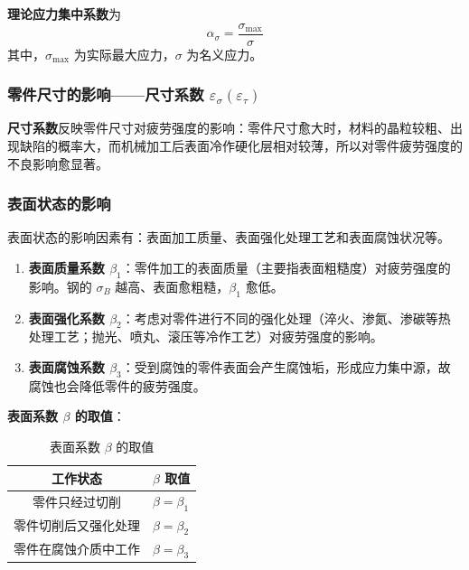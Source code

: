 \begin{definition}[理论应力集中系数]
\label{def:理论应力集中系数}
\textbf{理论应力集中系数}为
\begin{equation}
	\alpha_\sigma=\frac{\sigma_{\max}}{\sigma}
	\label{eq:强度:理论应力集中系数}
\end{equation}
其中，$\sigma_{\max}$ 为实际最大应力，$\sigma$ 为名义应力。
\end{definition}

\subsubsection{零件尺寸的影响——尺寸系数 $\varepsilon_\sigma(\varepsilon_\tau)$}

\begin{definition}
\label{def:尺寸系数}
\textbf{尺寸系数}反映零件尺寸对疲劳强度的影响：零件尺寸愈大时，材料的晶粒较粗、出现缺陷的概率大，而机械加工后表面冷作硬化层相对较薄，所以对零件疲劳强度的不良影响愈显著。
\end{definition}

\subsubsection{表面状态的影响}

\begin{definition}[表面状态的影响因素]
\label{def:表面状态}
表面状态的影响因素有：表面加工质量、表面强化处理工艺和表面腐蚀状况等。
\begin{enumerate}
	\item \textbf{表面质量系数 $\beta_1$}：零件加工的表面质量（主要指表面粗糙度）对疲劳强度的影响。钢的 $\sigma_B$ 越高、表面愈粗糙，$\beta_1$ 愈低。
	\item \textbf{表面强化系数 $\beta_2$}：考虑对零件进行不同的强化处理（淬火、渗氮、渗碳等热处理工艺；抛光、喷丸、滚压等冷作工艺）对疲劳强度的影响。
	\item \textbf{表面腐蚀系数 $\beta_3$}：受到腐蚀的零件表面会产生腐蚀垢，形成应力集中源，故腐蚀也会降低零件的疲劳强度。
\end{enumerate}
\end{definition}

\textbf{表面系数 $\beta$ 的取值}：

\begin{table}[H]
\centering
\caption{表面系数 $\beta$ 的取值}
\label{tab:强度:表面系数}
\begin{tabular}{cl}
	\toprule
	工作状态 & $\beta$ 取值 \\
	\midrule
	零件只经过切削 & $\beta=\beta_1$ \\
	零件切削后又强化处理 & $\beta=\beta_2$ \\
	零件在腐蚀介质中工作 & $\beta=\beta_3$ \\
	\bottomrule
\end{tabular}
\end{table}

